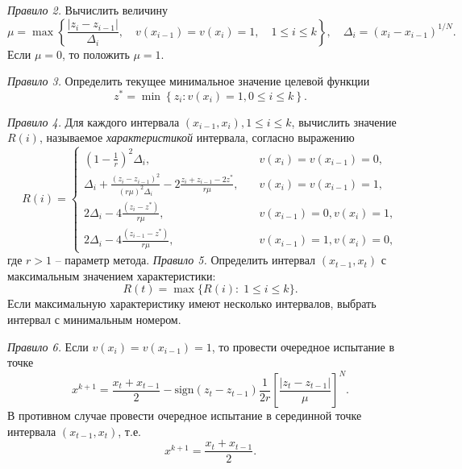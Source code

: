 \documentclass[10pt,a4paper]{book}
\begin{document}
\textit{Правило 2.} Вычислить величину
\begin{equation}\label{eq7} 
\mu = \max\left\{ \frac{|z_i-z_{i-1}|}{\Delta _i},\quad v(x_{i-1})=v(x_i)=1, \quad 1 \leq i \leq k  \right\},\quad \Delta _i= (x_i-x_{i-1})^{1/N}.
\end{equation}
Если $\mu=0$, то положить $\mu=1$.

\textit{Правило 3.} Определить текущее минимальное значение целевой функции
\begin{equation}\label{eq8} 
z^*= \min \left\{ z_i: v(x_i)=1, 0 \leq i \leq k \right\}.
\end{equation}

\textit{Правило 4.} Для каждого интервала $(x_{i-1},x_i),1 \leq i \leq k$, вычислить значение $R(i)$, называемое \textit{характеристикой} интервала, согласно выражению
\begin{equation}\label{eq9} 
R(i)=
  \begin{cases}
    {(1-\frac{1}{r})}^2 \Delta _i,& {\quad v(x_i)=v(x_{i-1})=0,} \\
    \Delta _i+\frac {{(z_i-z_{i-1})}^2}{{(r \mu)}^2 \Delta _i} - 2 \frac {z_i+z_{i-1}-2z^*}{r \mu}, & {\quad  v(x_i)=v(x_{i-1})=1},\\
    2 \Delta _i-4 \frac {(z_i-z^*)}{r \mu}, & {\quad v(x_{i-1})=0, v(x_i)=1},\\
    2 \Delta _i-4 \frac {(z_{i-1}-z^*)}{r \mu}, & {\quad  v(x_{i-1})=1, v(x_i)=0,}
  \end{cases}
\end{equation}
где $r>1$ -- параметр метода.
\textit{Правило 5.} Определить интервал $(x_{t-1},x_t)$ с максимальным значением характеристики:
\[
R(t)= \max\{R(i): \; 1 \leq i \leq k\}.
\]
Если максимальную характеристику имеют несколько интервалов, выбрать интервал
с минимальным номером.

\textit{Правило 6.} Если $v(x_i)=v(x_{i-1})=1$, то провести очередное испытание в точке 
\begin{equation}\label{eq11} 
x^{k+1}= \frac {x_t+x_{t-1}}{2} -  \text{sign} {(z_t-z_{t-1})} \frac{1}{2r} \left[\frac {{|z_t-z_{t-1}|}}{\mu} \right]^N.
\end{equation}
В противном случае провести очередное испытание в серединной точке интервала $(x_{t-1},x_t)$, т.е.
\begin{equation}\label{eq10} 
x^{k+1}=\frac {x_t+x_{t-1}}{2}.
\end{equation}
\end{document}
